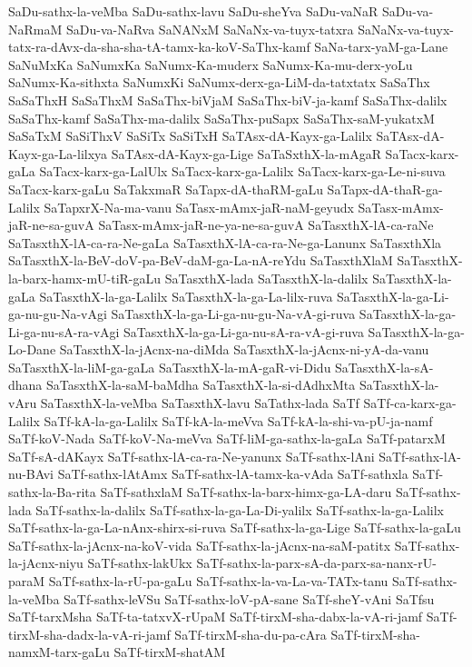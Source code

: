 {SaDu-sathx-la-veMba
SaDu-sathx-lavu
SaDu-sheYva
SaDu-vaNaR
SaDu-va-NaRmaM
SaDu-va-NaRva
SaNANxM
SaNaNx-va-tuyx-tatxra
SaNaNx-va-tuyx-tatx-ra-dAvx-da-sha-sha-tA-tamx-ka-koV-SaThx-kamf
SaNa-tarx-yaM-ga-Lane
SaNuMxKa
SaNumxKa
SaNumx-Ka-muderx
SaNumx-Ka-mu-derx-yoLu
SaNumx-Ka-sithxta
SaNumxKi
SaNumx-derx-ga-LiM-da-tatxtatx
SaSaThx
SaSaThxH
SaSaThxM
SaSaThx-biVjaM
SaSaThx-biV-ja-kamf
SaSaThx-dalilx
SaSaThx-kamf
SaSaThx-ma-dalilx
SaSaThx-puSapx
SaSaThx-saM-yukatxM
SaSaTxM
SaSiThxV
SaSiTx
SaSiTxH
SaTAsx-dA-Kayx-ga-Lalilx
SaTAsx-dA-Kayx-ga-La-lilxya
SaTAsx-dA-Kayx-ga-Lige
SaTaSxthX-la-mAgaR
SaTacx-karx-gaLa
SaTacx-karx-ga-LalUlx
SaTacx-karx-ga-Lalilx
SaTacx-karx-ga-Le-ni-suva
SaTacx-karx-gaLu
SaTakxmaR
SaTapx-dA-thaRM-gaLu
SaTapx-dA-thaR-ga-Lalilx
SaTapxrX-Na-ma-vanu
SaTasx-mAmx-jaR-naM-geyudx
SaTasx-mAmx-jaR-ne-sa-guvA
SaTasx-mAmx-jaR-ne-ya-ne-sa-guvA
SaTasxthX-lA-ca-raNe
SaTasxthX-lA-ca-ra-Ne-gaLa
SaTasxthX-lA-ca-ra-Ne-ga-Lanunx
SaTasxthXla
SaTasxthX-la-BeV-doV-pa-BeV-daM-ga-La-nA-reYdu
SaTasxthXlaM
SaTasxthX-la-barx-hamx-mU-tiR-gaLu
SaTasxthX-lada
SaTasxthX-la-dalilx
SaTasxthX-la-gaLa
SaTasxthX-la-ga-Lalilx
SaTasxthX-la-ga-La-lilx-ruva
SaTasxthX-la-ga-Li-ga-nu-gu-Na-vAgi
SaTasxthX-la-ga-Li-ga-nu-gu-Na-vA-gi-ruva
SaTasxthX-la-ga-Li-ga-nu-sA-ra-vAgi
SaTasxthX-la-ga-Li-ga-nu-sA-ra-vA-gi-ruva
SaTasxthX-la-ga-Lo-Dane
SaTasxthX-la-jAcnx-na-diMda
SaTasxthX-la-jAcnx-ni-yA-da-vanu
SaTasxthX-la-liM-ga-gaLa
SaTasxthX-la-mA-gaR-vi-Didu
SaTasxthX-la-sA-dhana
SaTasxthX-la-saM-baMdha
SaTasxthX-la-si-dAdhxMta
SaTasxthX-la-vAru
SaTasxthX-la-veMba
SaTasxthX-lavu
SaTathx-lada
SaTf
SaTf-ca-karx-ga-Lalilx
SaTf-kA-la-ga-Lalilx
SaTf-kA-la-meVva
SaTf-kA-la-shi-va-pU-ja-namf
SaTf-koV-Nada
SaTf-koV-Na-meVva
SaTf-liM-ga-sathx-la-gaLa
SaTf-patarxM
SaTf-sA-dAKayx
SaTf-sathx-lA-ca-ra-Ne-yanunx
SaTf-sathx-lAni
SaTf-sathx-lA-nu-BAvi
SaTf-sathx-lAtAmx
SaTf-sathx-lA-tamx-ka-vAda
SaTf-sathxla
SaTf-sathx-la-Ba-rita
SaTf-sathxlaM
SaTf-sathx-la-barx-himx-ga-LA-daru
SaTf-sathx-lada
SaTf-sathx-la-dalilx
SaTf-sathx-la-ga-La-Di-yalilx
SaTf-sathx-la-ga-Lalilx
SaTf-sathx-la-ga-La-nAnx-shirx-si-ruva
SaTf-sathx-la-ga-Lige
SaTf-sathx-la-gaLu
SaTf-sathx-la-jAcnx-na-koV-vida
SaTf-sathx-la-jAcnx-na-saM-patitx
SaTf-sathx-la-jAcnx-niyu
SaTf-sathx-lakUkx
SaTf-sathx-la-parx-sA-da-parx-sa-nanx-rU-paraM
SaTf-sathx-la-rU-pa-gaLu
SaTf-sathx-la-va-La-va-TATx-tanu
SaTf-sathx-la-veMba
SaTf-sathx-leVSu
SaTf-sathx-loV-pA-sane
SaTf-sheY-vAni
SaTfsu
SaTf-tarxMsha
SaTf-ta-tatxvX-rUpaM
SaTf-tirxM-sha-dabx-la-vA-ri-jamf
SaTf-tirxM-sha-dadx-la-vA-ri-jamf
SaTf-tirxM-sha-du-pa-cAra
SaTf-tirxM-sha-namxM-tarx-gaLu
SaTf-tirxM-shatAM
}
